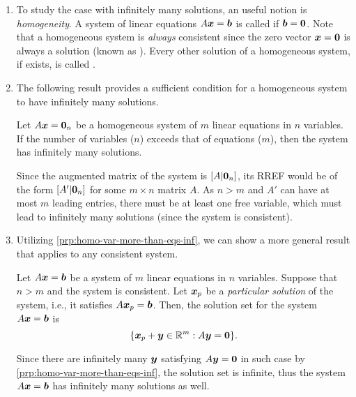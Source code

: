 \begin{enumerate}
\item To study the case with infinitely many solutions, an useful notion is
\emph{homogeneity}.  A system of linear equations \(A\vb*{x}=\vb*{b}\) is
called  if \(\vb*{b}=\vb*{0}\). Note that a homogeneous
system is \emph{always} consistent since the zero vector \(\vb*{x}=\vb*{0}\)
is always a solution (known as ). Every other solution
of a homogeneous system, if exists, is called .

\item The following result provides a sufficient condition for a homogeneous
system to have infinitely many solutions.

\begin{proposition}
\label{prp:homo-var-more-than-eqs-inf}
Let \(A\vb*{x}=\vb*{0}_n\) be a homogeneous system of \(m\) linear equations in
\(n\) variables. If the number of variables (\(n\)) exceeds that of equations
(\(m\)), then the system has infinitely many solutions.
\end{proposition}
\begin{pf}
Since the augmented matrix of the system is \([A|\vb*{0}_{n}]\), its RREF
would be of the form \([A'|\vb*{0}_{n}]\) for some \(m\times n\) matrix \(A\).
As \(n>m\) and \(A'\) can have at most \(m\) leading entries, there must be at
least one free variable, which must lead to infinitely many solutions (since
the system is consistent).
\end{pf}

\item Utilizing \cref{prp:homo-var-more-than-eqs-inf}, we can show a more
general result that applies to any consistent system.

\begin{proposition}
\label{prp:var-more-than-eqs-sol-set}
Let \(A\vb*{x}=\vb*{b}\) be a system of \(m\) linear equations in \(n\)
variables. Suppose that \(n>m\) and the system is consistent. Let
\(\vb*{x}_p\) be a \emph{particular solution} of the system, i.e., it
satisfies \(A\vb*{x}_p=\vb*{b}\). Then, the solution set for the system
\(A\vb*{x}=\vb*{b}\) is
\[
\{\vb*{x}_p+\vb*{y}\in\mathbb{R}^m:A\vb*{y}=\vb*{0}\}.
\]
\end{proposition}
\begin{note}
Since there are infinitely many \(\vb*{y}\) satisfying \(A\vb*{y}=\vb*{0}\)
in such case by \cref{prp:homo-var-more-than-eqs-inf}, the solution set is
infinite, thus the system \(A\vb*{x}=\vb*{b}\) has infinitely many solutions
as well.
\end{note}


\end{enumerate}
